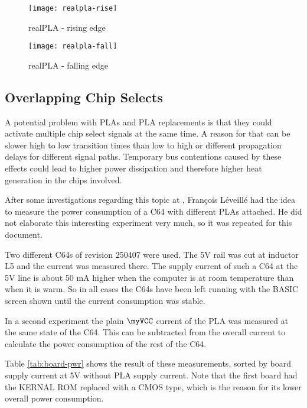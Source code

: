 \begin{figure}
    \begin{minipage}{0.45\linewidth}
        \centering
        \texttt{[image: realpla-rise]}
        \caption{realPLA - rising edge}
        \label{fig:realpla-rise}
    \end{minipage}
    \hfill
    \begin{minipage}{0.45\linewidth}
        \centering
        \texttt{[image: realpla-fall]}
        \caption{realPLA - falling edge}
        \label{fig:realpla-fall}
    \end{minipage}
\end{figure}

\subsection{Overlapping Chip Selects}

A potential problem with PLAs and PLA replacements is that they could
activate multiple chip select signals at the same time. A reason for that
can be slower high to low transition times than low to high or different
propagation delays for different signal paths. Temporary bus contentions
caused by these effects could lead to higher power dissipation and therefore
higher heat generation in the chips involved.

After some investigations regarding this topic at \cite{esl11}, François
Léveillé had the idea to measure the power consumption of a C64 with
different PLAs attached. He did not elaborate this interesting experiment
very much, so it was repeated for this document.

Two different C64s of revision 250407 were used. The 5V rail was cut at
inductor L5 and the current was measured there. The supply current of such
a C64 at the 5V line is about 50 mA higher when the computer is at room
temperature than when it is warm. So in all cases the C64s have been left
running with the BASIC screen shown until the current consumption was stable.

In a second experiment the plain $\myVCC$ current of the PLA was measured at
the same state of the C64. This can be subtracted from the overall current
to calculate the power consumption of the rest of the C64.

Table \ref{tab:board-pwr} shows the result of these measurements, sorted by
board supply current at 5V without PLA supply current. Note that the first
board had the KERNAL ROM replaced with a CMOS type, which is the reason for its
lower overall power consumption.

